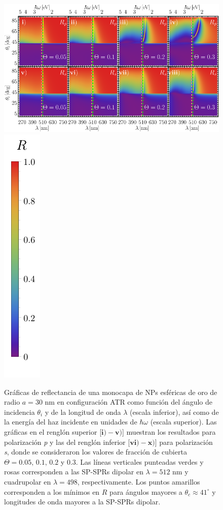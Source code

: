 	\begin{figure}[h!]\centering
\includegraphics[width = .75\linewidth]{2-Resultados/figs/6-AuThetaVar/0-2D_Grid}%
\includegraphics[scale=.85, trim={00 -5 00 00}, clip]{2-Resultados/figs/0-RBar_v}\vspace*{-.5em}
	\caption{Gráficas de reflectancia de una monocapa de NPs esféricas de oro de radio $a=30$ nm en configuración ATR como función del ángulo de incidencia $\theta_i$ y de la longitud de onda $\lambda$ (escala inferior), así como de la energía del haz incidente en unidades de $\hbar\omega$ (escala superior).  Las gráficas   en el renglón superior [$\mathbf{i)-v)}$] muestran los resultados para  polarización \emph{p} y las del renglón inferior  [$\mathbf{vi)-x)}$]  para polarización  \emph{s}, donde se consideraron los valores de fracción de cubierta $\Theta = 0.05,\,0.1,\,0.2$ y $0.3$.  Las líneas verticales punteadas verdes y rosas corresponden a las SP-SPRs dipolar en $\lambda=512$ nm y  cuadrupolar en $\lambda=498$, respectivamente.  Los puntos amarillos corresponden a los mínimos en $R$ para ángulos mayores a $\theta_c\approx 41^\circ$ y longitudes de onda mayores a la SP-SPRs dipolar.
}	\label{fig:Au-R-Theta}	
	\end{figure}	

